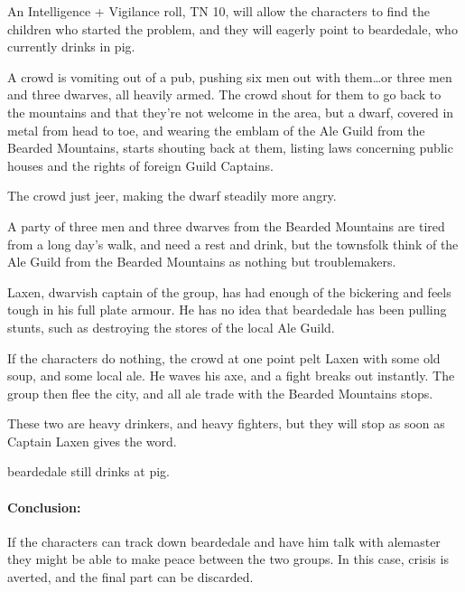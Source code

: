 \begin{multicols}{2}
An Intelligence + Vigilance roll, TN 10, will allow the characters to find the children who started the problem, and they will eagerly point to \gls{beardedale}, who currently drinks in \gls{pig}.



\begin{boxtext}
	A crowd is vomiting out of a pub, pushing six men out with them\ldots or three men and three dwarves, all heavily armed.  The crowd shout for them to go back to the mountains and that they're not welcome in the area, but a dwarf, covered in metal from head to toe, and wearing the emblam of the Ale Guild from the Bearded Mountains, starts shouting back at them, listing laws concerning public houses and the rights of foreign Guild Captains.

	The crowd just jeer, making the dwarf steadily more angry.
\end{boxtext}

A party of three men and three dwarves from the Bearded Mountains are tired from a long day's walk, and need a rest and drink, but the townsfolk think of the Ale Guild from the Bearded Mountains as nothing but troublemakers.

Laxen, dwarvish captain of the group, has had enough of the bickering and feels tough in his full plate armour.  He has no idea that \gls{beardedale} has been pulling stunts, such as destroying the stores of the local Ale Guild.

If the characters do nothing, the crowd at one point pelt Laxen with some old soup, and some local ale.  He waves his axe, and a fight breaks out instantly.  The group then flee the city, and all ale trade with the Bearded Mountains stops.

\dwarvensoldier


These two are heavy drinkers, and heavy fighters, but they will stop as soon as Captain Laxen gives the word.

\dwarventrader


\humansoldier

\Gls{beardedale} still drinks at \gls{pig}.  

\paragraph{Conclusion:} If the characters can track down \gls{beardedale} and have him talk with \gls{alemaster} they might be able to make peace between the two groups.  In this case, crisis is averted, and the final part can be discarded.


\end{multicols}
